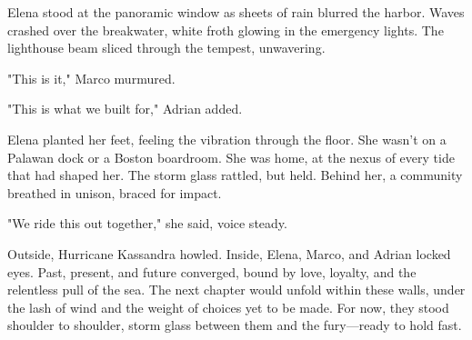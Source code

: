 Elena stood at the panoramic window as sheets of rain blurred the harbor. Waves crashed over the breakwater, white froth glowing in the emergency lights. The lighthouse beam sliced through the tempest, unwavering.

"This is it," Marco murmured.

"This is what we built for," Adrian added.

Elena planted her feet, feeling the vibration through the floor. She wasn't on a Palawan dock or a Boston boardroom. She was home, at the nexus of every tide that had shaped her. The storm glass rattled, but held. Behind her, a community breathed in unison, braced for impact.

"We ride this out together," she said, voice steady.

Outside, Hurricane Kassandra howled. Inside, Elena, Marco, and Adrian locked eyes. Past, present, and future converged, bound by love, loyalty, and the relentless pull of the sea. The next chapter would unfold within these walls, under the lash of wind and the weight of choices yet to be made. For now, they stood shoulder to shoulder, storm glass between them and the fury—ready to hold fast.


